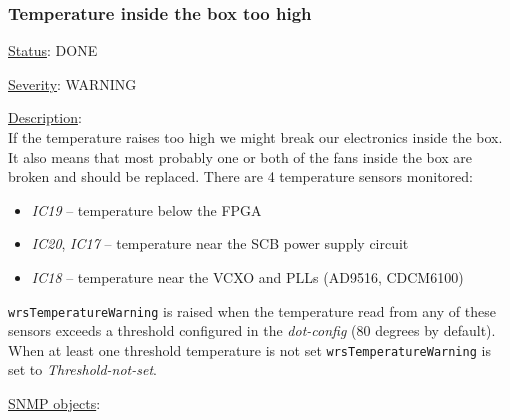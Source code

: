 \subsubsection{\bf Temperature inside the box too high}
		\label{fail:other:temp}
		\begin{pck_descr}
			\item [] \underline{Status}: DONE
			\item [] \underline{Severity}: WARNING
			\item [] \underline{Description}:\\
				If the temperature raises too high we might break our electronics inside
				the box. It also means that most probably one or both of the fans inside
				the box are broken and should be replaced. There are 4 temperature
				sensors monitored:
				\begin{itemize}
					\item \emph{IC19} -- temperature below the FPGA
					\item \emph{IC20}, \emph{IC17} -- temperature near the SCB power supply
						circuit
					\item \emph{IC18} -- temperature near the VCXO and PLLs (AD9516,
						CDCM6100)
				\end{itemize}
				\texttt{wrsTemperatureWarning} is raised when the temperature read from
				any of these sensors exceeds a threshold configured in the
				\emph{dot-config} (80 degrees by default). When at least one threshold
				temperature is not set \texttt{wrsTemperatureWarning} is set to
				\emph{Threshold-not-set}.
			\item [] \underline{SNMP objects}:\\
				{\footnotesize
				\\
				\\
				\\
				\\
				\\
				\\
				\\
				\\
				\\
				\\
				 }
		\end{pck_descr}

